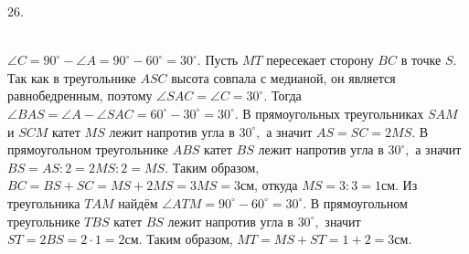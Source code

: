 26. \begin{figure}[ht!]
\end{figure}\\
$\angle C=90^\circ-\angle A=90^\circ-60^\circ=30^\circ.$ Пусть $MT$ пересекает сторону $BC$ в точке $S.$ Так как в треугольнике $ASC$ высота совпала с медианой, он является равнобедренным, поэтому $\angle SAC=\angle C=30^\circ.$ Тогда $\angle BAS=\angle A-\angle SAC=60^\circ-30^\circ=30^\circ.$ В прямоугольных треугольниках $SAM$ и $SCM$ катет $MS$ лежит напротив угла в $30^\circ,$ а значит $AS=SC=2MS.$ В прямоугольном треугольнике $ABS$ катет $BS$ лежит напротив угла
в $30^\circ,$ а значит $BS=AS:2=2MS:2=MS.$ Таким образом, $BC=BS+SC=MS+2MS=3MS=3$см, откуда $MS=3:3=1$см. Из треугольника $TAM$ найдём $\angle ATM=90^\circ-60^\circ=30^\circ.$ В прямоугольном треугольнике $TBS$ катет $BS$ лежит напротив угла в $30^\circ,$ значит $ST=2BS=2\cdot1=2$см. Таким образом, $MT=MS+ST=1+2=3$см.\\
